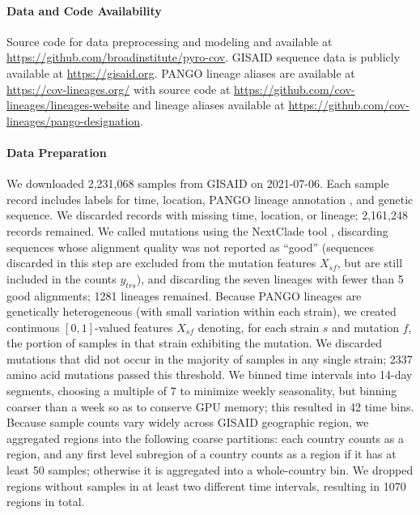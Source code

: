 \documentclass[12pt]{article}
\begin{document}
\paragraph*{Data and Code Availability}

Source code for data preprocessing and modeling and available at
\url{https://github.com/broadinstitute/pyro-cov}.
GISAID sequence data is publicly available at
\url{https://gisaid.org}.
PANGO lineage aliases are available at \url{https://cov-lineages.org/} with source code at \url{https://github.com/cov-lineages/lineages-website} and lineage aliases available at \url{https://github.com/cov-lineages/pango-designation}.

\paragraph*{Data Preparation}

We downloaded 2,231,068 samples from GISAID 
\cite{elbe2017gisaid} on 2021-07-06.
Each sample record includes labels for time, location, PANGO lineage annotation \cite{rambaut2020dynamic}, and genetic sequence.
We discarded records with missing time, location, or lineage; 2,161,248 records remained.
We called mutations using the NextClade tool \cite{aksamentov2020nextclade}, discarding sequences whose alignment quality was not reported as ``good'' (sequences discarded in this step are excluded from the mutation features $X_{sf}$, but are still included in the counts $y_{trs}$), and discarding the seven lineages with fewer than 5 good alignments; 1281 lineages remained.
Because PANGO lineages are genetically heterogeneous (with small variation within each strain), we created continuous $[0, 1]$-valued features $X_{sf}$ denoting, for each strain $s$ and mutation $f$, the portion of samples in that strain exhibiting the mutation.
We discarded mutations that did not occur in the majority of samples in any single strain; 2337 amino acid mutations passed this threshold.
We binned time intervals into 14-day segments, choosing a multiple of 7 to minimize weekly seasonality, but binning coarser than a week so as to conserve GPU memory; this resulted in 42 time bins.
Because sample counts vary widely across GISAID geographic region, we aggregated regions into the following coarse partitions: each country counts as a region, and any first level subregion of a country counts as a region if it has at least 50 samples; otherwise it is aggregated into a whole-country bin.
We dropped regions without samples in at least two different time intervals, resulting in 1070 regions in total.
\end{document}
